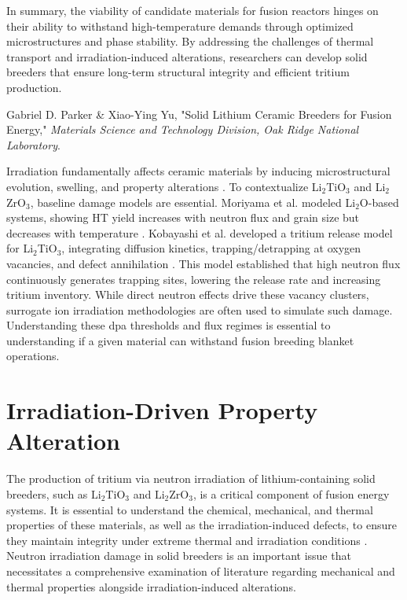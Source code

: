 \documentclass[review,12pt,a4paper]{elsarticle}
\begin{document}
\textcolor{highconf}{In summary, the viability of candidate materials for fusion reactors hinges on their ability to withstand high-temperature demands through optimized microstructures and phase stability. By addressing the challenges of thermal transport and irradiation-induced alterations, researchers can develop solid breeders that ensure long-term structural integrity and efficient tritium production.}

\citep{ruegsegger_scoping_2023} Gabriel D. Parker \& Xiao-Ying Yu, "Solid Lithium Ceramic Breeders for Fusion Energy," \textit{Materials Science and Technology Division, Oak Ridge National Laboratory}.

\textcolor{medconf}{Irradiation fundamentally affects ceramic materials by inducing microstructural evolution, swelling, and property alterations \citep{ruegsegger_scoping_2023}. To contextualize Li$_{2}$TiO$_{3}$ and Li$_{2}$ZrO$_{3}$, baseline damage models are essential. Moriyama et al. modeled Li$_{2}$O-based systems, showing HT yield increases with neutron flux and grain size but decreases with temperature \citep{ruegsegger_scoping_2023}. Kobayashi et al. developed a tritium release model for Li$_{2}$TiO$_{3}$, integrating diffusion kinetics, trapping/detrapping at oxygen vacancies, and defect annihilation \citep{gu_effects_2021}. This model established that high neutron flux continuously generates trapping sites, lowering the release rate and increasing tritium inventory. While direct neutron effects drive these vacancy clusters, surrogate ion irradiation methodologies are often used to simulate such damage. Understanding these dpa thresholds and flux regimes is essential to understanding if a given material can withstand fusion breeding blanket operations.}

\section*{Irradiation-Driven Property Alteration}


\textcolor{medconf}{The production of tritium via neutron irradiation of lithium-containing solid breeders, such as $\mathrm{Li}_2\mathrm{TiO}_3$ and $\mathrm{Li}_2\mathrm{ZrO}_3$, is a critical component of fusion energy systems. It is essential to understand the chemical, mechanical, and thermal properties of these materials, as well as the irradiation-induced defects, to ensure they maintain integrity under extreme thermal and irradiation conditions \citep{ruegsegger_scoping_2023}. Neutron irradiation damage in solid breeders is an important issue that necessitates a comprehensive examination of literature regarding mechanical and thermal properties alongside irradiation-induced alterations.}
\end{document}
